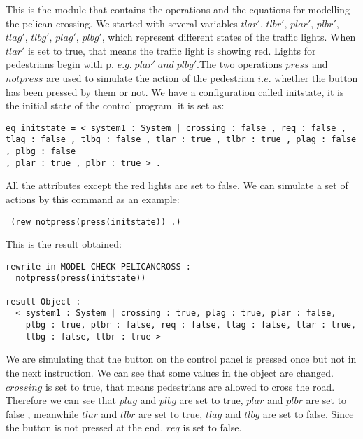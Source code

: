 \documentclass{report}
\begin{document}
\vspace{0.5cm}
This is the module that contains the operations and the equations for modelling the pelican crossing.
We started with several variables $tlar'$, $tlbr'$, $plar'$, $plbr'$, $tlag'$, $tlbg'$, $plag'$, $plbg'$, which represent different states of the  traffic lights. When $tlar'$ is set to true, that means the traffic light is showing red. Lights for pedestrians begin with p. $e.g.\;plar'\;and\;plbg'$.\newline The two operations $press$ and $notpress$ are used to simulate the action of the pedestrian $i.e.$ whether the button has been pressed by them or not.  We have a configuration called initstate, it is the initial state of the control program. it is set as:
\begin{verbatim}
eq initstate = < system1 : System | crossing : false , req : false , 
tlag : false , tlbg : false , tlar : true , tlbr : true , plag : false , plbg : false 
, plar : true , plbr : true > .
\end{verbatim}
All the attributes except the red lights are set to false.
We can simulate a set of actions by this command as an example:
\begin{verbatim} (rew notpress(press(initstate)) .)\end{verbatim}
This is the result obtained:
\begin{lstlisting}[frame=single,linewidth=14.6cm]
rewrite in MODEL-CHECK-PELICANCROSS :
  notpress(press(initstate))
	
result Object :
  < system1 : System | crossing : true, plag : true, plar : false,
    plbg : true, plbr : false, req : false, tlag : false, tlar : true,
    tlbg : false, tlbr : true >
\end{lstlisting}
We are simulating that the button on the control panel is pressed once but not in the next instruction.
We can see that some values in the object are changed. $crossing$ is set to true, that means pedestrians are allowed to cross the road. Therefore we can see that $plag$ and $plbg$ are set to true, $plar$ and $plbr$ are set to false , meanwhile $tlar$ and $tlbr$ are set to true, $tlag$ and $tlbg$ are set to false. Since the button is not pressed at the end. $req$ is set to false. 
\newpage
\end{document}
